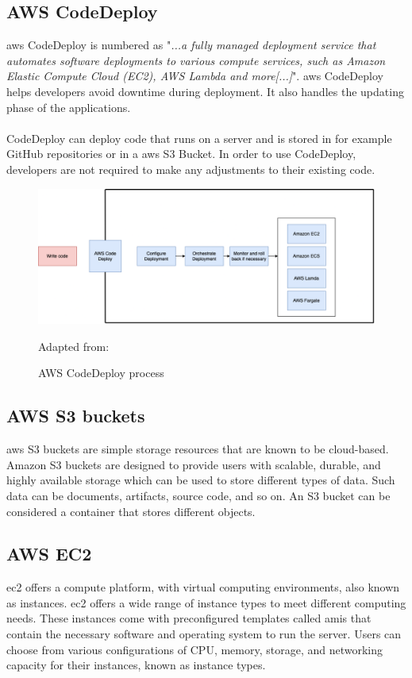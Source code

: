 \subsection{AWS CodeDeploy}
\acrshort{aws} CodeDeploy is numbered as "\textit{...a fully managed deployment service that automates software deployments to various compute services, such as Amazon Elastic Compute Cloud (EC2), AWS Lambda and more[...]}"\cite{AWSCodeDeploy}.
\acrshort{aws} CodeDeploy helps developers avoid downtime during deployment. It also handles the updating phase of the applications. 
\\~\\
CodeDeploy can deploy code that runs on a server and is stored in for example GitHub repositories or in a \acrshort{aws} S3 Bucket. In order to use CodeDeploy, developers are not required to make any adjustments to their existing code. \cite{CodeDeploy1}

\begin{figure}[H]
    \centering
    \includegraphics[scale=0.4]{Images/AWSCodeDeploy.png}
    \caption{AWS CodeDeploy process} Adapted from: \cite{CodeDeploy1}
    \label{fig:AWS CodeDeploy Process}
\end{figure}


\subsection{AWS S3 buckets}
\acrshort{aws} S3 buckets are simple storage resources that are known to be cloud-based. Amazon S3 buckets are designed to provide users with scalable, durable, and highly available storage which can be used to store different types of data. Such data can be documents, artifacts, source code, and so on. An S3 bucket can be considered a container that stores different objects. \cite{S3Bucket}

\subsection{AWS EC2}
\acrlong{ec2} offers a \gls{compute platform}, with virtual computing environments, also known as instances. \acrlong{ec2} offers a wide range of instance types to meet different computing needs. These instances come with preconfigured templates called \acrlong{amis} that contain the necessary software and operating system to run the server. Users can choose from various configurations of CPU, memory, storage, and networking capacity for their instances, known as instance types.\cite{awsec2}